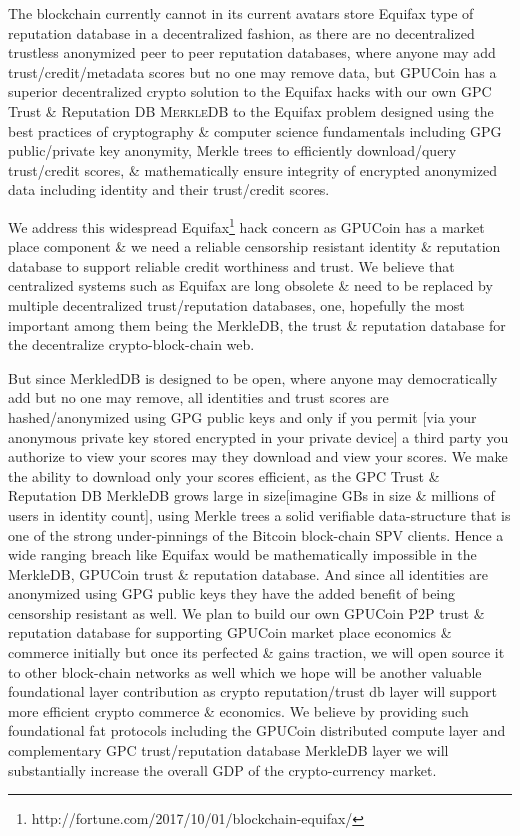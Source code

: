 The blockchain currently cannot in its current avatars store Equifax type of reputation database in a decentralized fashion, as there are no decentralized trustless anonymized peer to peer reputation databases, where anyone may add trust/credit/metadata scores but no one may remove data, but GPUCoin has a superior decentralized crypto solution to the Equifax hacks with our own GPC Trust \& Reputation DB \textsc{MerkleDB} to the Equifax problem designed using the best practices of cryptography \& computer science fundamentals including GPG public/private key anonymity, Merkle trees to efficiently download/query trust/credit scores, \& mathematically ensure integrity of encrypted anonymized data including identity and their trust/credit scores.

We address this widespread Equifax\footnote{http://fortune.com/2017/10/01/blockchain-equifax/} hack concern as GPUCoin has a market place component \& we need a reliable censorship resistant identity \& reputation database to support reliable credit worthiness and trust. We believe that centralized systems such as Equifax are long obsolete \& need to be replaced by multiple decentralized trust/reputation databases, one, hopefully the most important among them being the MerkleDB, the trust \& reputation database for the decentralize crypto-block-chain web. 

But since MerkledDB is designed to be open, where anyone may democratically add but no one may remove, all identities and trust scores are hashed/anonymized using GPG public keys and only if you permit [via your anonymous private key stored encrypted in your private device] a third party you authorize to view your scores may they download and view your scores. We make the ability to download only your scores efficient, as the GPC Trust \& Reputation DB MerkleDB grows large in size[imagine GBs in size \& millions of users in identity count], using Merkle trees a solid verifiable data-structure that is one of the strong under-pinnings of the Bitcoin block-chain SPV clients. Hence a wide ranging breach like Equifax would be mathematically impossible in the MerkleDB, GPUCoin trust \& reputation database.
And since all identities are anonymized using GPG public keys they have the added benefit of being censorship resistant as well. We plan to build our own GPUCoin P2P trust \& reputation database for supporting GPUCoin market place economics \& commerce initially but once its perfected \& gains traction, we will open source it to other block-chain networks as well which we hope will be another valuable foundational layer contribution as crypto reputation/trust db layer will support more efficient crypto commerce \& economics. We believe by providing such foundational fat protocols including the GPUCoin distributed compute layer and complementary GPC trust/reputation database MerkleDB layer we will substantially increase the overall GDP of the crypto-currency market.
